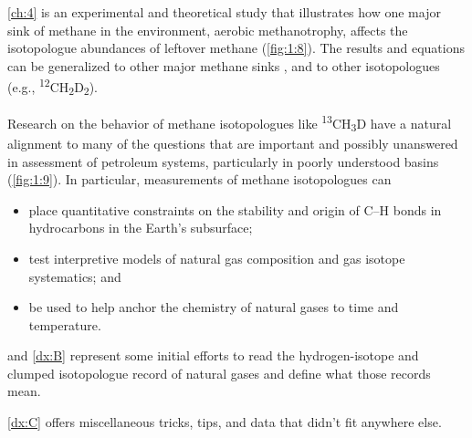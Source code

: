 \autoref{ch:4} is an experimental and theoretical study that illustrates how
one major sink of methane in the environment, aerobic methanotrophy,
affects the isotopologue abundances of leftover methane (\autoref{fig:1:8}). The
results and equations can be generalized to other major methane sinks \parencite[including oxidation by OH and Cl in the atmosphere;][]{Whitehill++_2017_GCA}, and to other isotopologues (e.g.,
\textsuperscript{12}CH\textsubscript{2}D\textsubscript{2}).




Research on the behavior of methane isotopologues like
\textsuperscript{13}CH\textsubscript{3}D have a natural alignment to
many of the questions that are important and possibly unanswered in
assessment of petroleum systems, particularly in poorly understood
basins (\autoref{fig:1:9}). In particular, measurements of methane isotopologues can
\begin{itemize}
	\item
	place quantitative constraints on the stability and origin of C--H
	bonds in hydrocarbons in the Earth's subsurface;
	\item
	test interpretive models of natural gas composition and gas isotope
	systematics; and
	\item
	be used to help anchor the chemistry of natural gases to time and
	temperature.
\end{itemize}

 and \ref{dx:B} represent some initial efforts to read the
hydrogen-isotope and clumped isotopologue record of natural gases and
define what those records mean.

\autoref{dx:C} offers miscellaneous tricks, tips, and data that didn't fit
anywhere else.

























